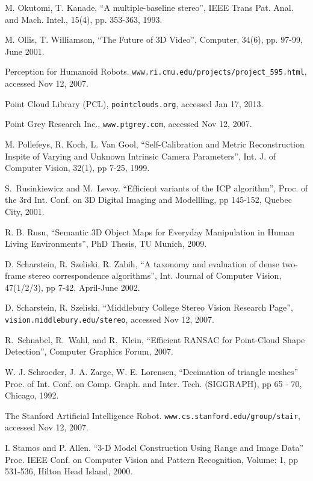\documentclass[twocolumn,oneside]{book}
\begin{document}
\begin{thebibliography}{99}
M. Okutomi, T. Kanade,
``A multiple-baseline stereo'',
IEEE Trans Pat. Anal. and Mach. Intel., 15(4), pp. 353-363, 1993.

M. Ollis, T. Williamson,
``The Future of 3D Video'', Computer, 34(6), pp. 97-99, June 2001.

Perception for Humanoid Robots.
\verb+www.ri.cmu.edu/projects/project_595.html+, accessed Nov 12, 2007.

Point Cloud Library (PCL),
\verb+pointclouds.org+, accessed Jan 17, 2013.

Point Grey Research Inc.,
\verb+www.ptgrey.com+, accessed Nov 12, 2007.

M. Pollefeys, R. Koch, L. Van Gool,
``Self-Calibration and Metric Reconstruction Inspite of Varying and Unknown Intrinsic Camera Parameters'',
Int. J. of Computer Vision, 32(1), pp 7-25, 1999.

S.~Rusinkiewicz and M.~Levoy.
``Efficient variants of the {ICP} algorithm'',
Proc. of the 3rd Int. Conf. on 3D Digital Imaging and Modellling, pp 145-152,
Quebec City, 2001.

R. B. Rusu,
``Semantic 3D Object Maps for Everyday Manipulation in Human Living Environments'',
PhD Thesis, TU Munich, 2009.

D. Scharstein, R. Szeliski, R. Zabih,
``A taxonomy and evaluation of dense two-frame stereo correspondence algorithms'',
Int. Journal of Computer Vision, 47(1/2/3), pp 7-42, April-June 2002.

D. Scharstein, R. Szeliski,
``Middlebury College Stereo Vision Research Page'',
\verb+vision.middlebury.edu/stereo+, accessed Nov 12, 2007.

R.~Schnabel, R.~Wahl, and R.~Klein,
``Efficient RANSAC for Point-Cloud Shape Detection'',
Computer Graphics Forum, 2007.

W. J. Schroeder, J. A. Zarge, W. E. Lorensen,
``Decimation of triangle meshes''
Proc.  of Int. Conf. on Comp. Graph. and Inter. Tech. (SIGGRAPH), pp 65 - 70, Chicago, 1992.

The Stanford Artificial Intelligence Robot.
\verb+www.cs.stanford.edu/group/stair+, accessed Nov 12, 2007.

I. Stamos and P. Allen.
``3-D Model Construction Using Range and Image Data''
Proc. IEEE Conf. on Computer Vision and Pattern Recognition, 
Volume: 1,  pp 531-536, Hilton Head Island, 2000. 


\end{thebibliography}
\end{document}
